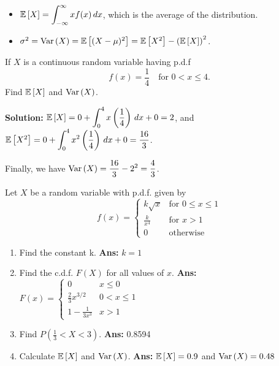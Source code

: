\begin{remark}
    \phantom{}\
    \begin{itemize}
        \item $\mathbb{E}\left[{X}\right] = \displaystyle \int_{-\infty}^{\infty} xf(x) \, dx$, which is the average of the distribution.
        \item $\sigma^2 = \operatorname{Var}\left({X}\right) = \mathbb{E}\left[{(X - \mu)^2}\right] = \mathbb{E}\left[{X^2}\right] - \left( \mathbb{E}\left[{X}\right] \right)^2$.
    \end{itemize}
\end{remark}

\begin{example}
    If $X$ is a continuous random variable having p.d.f 
    \[f(x) = \frac{1}{4} \quad \text{for $0 < x \leq 4$}.\]
    Find $\mathbb{E}\left[{X}\right]$ and $\operatorname{Var}\left({X}\right)$.

    \textbf{Solution:} $\mathbb{E}\left[{X}\right] = 0 + \displaystyle \int_{0}^{4} x \left( \frac{1}{4} \right) \, dx + 0= 2$,
    and $\mathbb{E}\left[{X^2}\right] = 0 + \displaystyle \int_{0}^{4} x^2 \left( \frac{1}{4} \right) \, dx + 0 = \frac{16}{3}$.

    Finally, we have $\displaystyle \operatorname{Var}\left({X}\right) = \frac{16}{3} - 2^2 = \frac{4}{3}$. \\
\end{example}

\begin{example}
    Let $X$ be a random variable with p.d.f. given by
    \[
        f(x) = 
        \begin{cases} 
        k \sqrt{x} & \text{for } 0 \leq x \leq 1 \\
        \frac{k}{x^4} & \text{for } x > 1 \\
        0 & \text{otherwise}
        \end{cases}
    \]
    \begin{enumerate}[label=(\alph*)]
        \item Find the constant k. \quad \textbf{Ans:} $k = 1$
        \item Find the c.d.f. $F(X)$ for all values of $x$. \quad
        \textbf{Ans:} 
        $F(x) = 
        \begin{cases} 
            0 & x \leq 0 \\
            \frac{2}{3} x^{3/2} & 0 < x \leq 1 \\
            1 - \frac{1}{3x^3} & x > 1
        \end{cases}$
        \item Find $P(\frac{1}{3} < X < 3)$. \quad \textbf{Ans:} 0.8594
        \item Calculate $\mathbb{E}\left[{X}\right]$ and $\operatorname{Var}\left({X}\right)$. \quad \textbf{Ans:} $\mathbb{E}\left[{X}\right] = 0.9$ and $\operatorname{Var}\left({X}\right) = 0.48$
    \end{enumerate}
\end{example}


